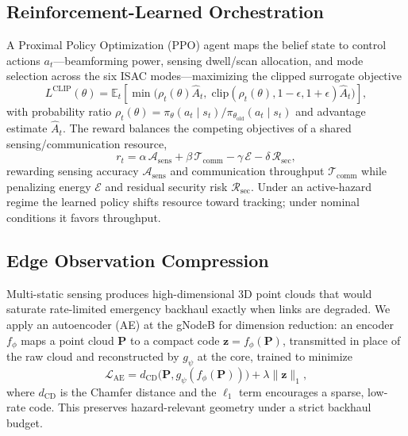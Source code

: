 \documentclass[10pt,twocolumn]{article}
\begin{document}
\subsection{Reinforcement-Learned Orchestration}
A Proximal Policy Optimization (PPO) agent maps the belief state to control
actions $a_t$---beamforming power, sensing dwell/scan allocation, and mode
selection across the six ISAC modes---maximizing the clipped surrogate
objective
\begin{equation}
L^{\mathrm{CLIP}}(\theta) = \mathbb{E}_t\!\left[\min\!\big(\rho_t(\theta)\hat{A}_t,\;
\mathrm{clip}(\rho_t(\theta),1-\epsilon,1+\epsilon)\hat{A}_t\big)\right],
\end{equation}
with probability ratio $\rho_t(\theta)=\pi_\theta(a_t\mid s_t)/
\pi_{\theta_{\mathrm{old}}}(a_t\mid s_t)$ and advantage estimate $\hat{A}_t$. The
reward balances the competing objectives of a shared sensing/communication
resource,
\begin{equation}
r_t = \alpha\,\mathcal{A}_{\mathrm{sens}}
+ \beta\,\mathcal{T}_{\mathrm{comm}}
- \gamma\,\mathcal{E}
- \delta\,\mathcal{R}_{\mathrm{sec}},
\end{equation}
rewarding sensing accuracy $\mathcal{A}_{\mathrm{sens}}$ and communication
throughput $\mathcal{T}_{\mathrm{comm}}$ while penalizing energy $\mathcal{E}$
and residual security risk $\mathcal{R}_{\mathrm{sec}}$. Under an active-hazard
regime the learned policy shifts resource toward tracking; under nominal
conditions it favors throughput.

\subsection{Edge Observation Compression}
Multi-static sensing produces high-dimensional 3D point clouds that would
saturate rate-limited emergency backhaul exactly when links are degraded. We
apply an autoencoder (AE) at the gNodeB for dimension reduction: an encoder
$f_\phi$ maps a point cloud $\mathbf{P}$ to a compact code
$\mathbf{z}=f_\phi(\mathbf{P})$, transmitted in place of the raw cloud and
reconstructed by $g_\psi$ at the core, trained to minimize
\begin{equation}
\mathcal{L}_{\mathrm{AE}} = d_{\mathrm{CD}}\!\big(\mathbf{P},
g_\psi(f_\phi(\mathbf{P}))\big) + \lambda\lVert\mathbf{z}\rVert_1,
\end{equation}
where $d_{\mathrm{CD}}$ is the Chamfer distance and the $\ell_1$ term encourages
a sparse, low-rate code. This preserves hazard-relevant geometry under a strict
backhaul budget.
\end{document}
